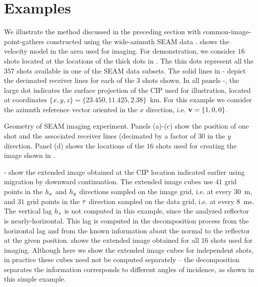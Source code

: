 \section{Examples}


We illustrate the method discussed in the preceding section with
common-image-point-gathers constructed using the wide-azimuth SEAM
data \cite[]{}.  shows the velocity model in the area used
for imaging. For demonstration, we consider $16$ shots located at the
locations of the thick dots in . The thin dots represent all
the $357$ shots available in one of the SEAM data subsets. The
solid lines in - depict the
decimated receiver lines for each of the $3$ shots shown. In all
panels -, the large dot indicates the
surface projection of the CIP used for illustration, located at
coordinates $\{x,y,z\}=\{23.450,11.425,2.38\}$~km. For this example we
consider the azimuth reference vector oriented in the $x$ direction,
i.e. $\vv=\{1,0,0\}$.


{Geometry of SEAM imaging experiment. Panels (a)-(c) show the position
of one shot and the associated receiver lines (decimated by a factor
of $30$ in the $y$ direction. Panel (d) shows the locations of the
$16$ shots used for creating the image shown in .}

- show the extended image obtained at
the CIP location indicated earlier using migration by downward
continuation. The extended image cubes use $41$ grid points in the
$\hx$ and $\hy$ directions sampled on the image grid, i.e. at every
$30$~m, and $31$ grid points in the $\tt$ direction sampled on the
data grid, i.e. at every $8$~ms. The vertical lag $\hz$ is not
computed in this example, since the analyzed reflector is
nearly-horizontal. This lag is computed in the decomposition process
from the horizontal lag and from the known information about the normal to
the reflector at the given position.  shows the extended
image obtained for all $16$ shots used for imaging. Although here we
show the extended image cubes for independent shots, in practice these
cubes need not be computed separately -- the decomposition separates
the information corresponds to different angles of incidence, as shown
in this simple example.

